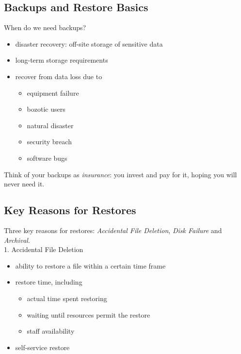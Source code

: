 \documentclass[xga]{xdvislides}
\begin{document}
\subsection{Backups and Restore Basics}
When do we need backups?
\begin{itemize}
	\item disaster recovery: off-site storage of sensitive data
	\item long-term storage requirements
	\item recover from data loss due to
		\begin{itemize}
			\item equipment failure
			\item bozotic users
			\item natural disaster
			\item security breach
			\item software bugs
		\end{itemize}
\end{itemize}
\addvspace{.5in}
Think of your backups as {\em insurance}:  you invest and pay for it, hoping
you will never need it.


\subsection{Key Reasons for Restores}
Three key reasons for restores: {\em Accidental File Deletion}, {\em Disk
Failure} and {\em Archival}.
\\

1. Accidental File Deletion
\begin{itemize}
	\item ability to restore a file within a certain time frame
	\item restore time, including
		\begin{itemize}
			\item actual time spent restoring
			\item waiting until resources permit the restore
			\item staff availability
		\end{itemize}
	\item self-service restore
\end{itemize}
\end{document}
